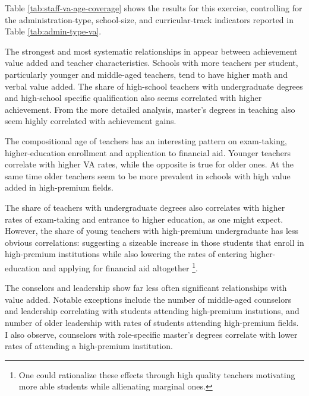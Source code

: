 \documentclass[a4paper, article, english, oneside, unknownkeysallowed, 12pt]{memoir}
\begin{document}


Table \ref{tab:staff-va-age-coverage} shows the results for this exercise, controlling for the administration-type, school-size, and curricular-track indicators reported in Table \ref{tab:admin-type-va}.

The strongest and most systematic relationships in  appear between achievement value added and teacher characteristics.
Schools with more teachers per student, particularly younger and middle-aged teachers, tend to have higher math and verbal value added. 
The share of high-school teachers with undergraduate degrees and high-school specific qualification also seems correlated with higher achievement.
From the more detailed analysis, master's degrees in teaching also seem highly correlated with achievement gains.

The compositional age of teachers has an interesting pattern on exam-taking, higher-education enrollment and application to financial aid. 
Younger teachers correlate with higher VA rates, while the opposite is true for older ones.
At the same time older teachers seem to be more prevalent in schools with high value added in high-premium fields.

The share of teachers with undergraduate degrees also correlates with higher rates of exam-taking and entrance to higher education, as one might expect.
However, the share of young teachers with high-premium undergraduate has less obvious correlations: 
suggesting a sizeable increase in those students that enroll in high-premium institutions while also lowering the rates of entering higher-education and applying for financial aid altogether
\footnote{One could rationalize these effects through high quality teachers motivating more able students while allienating marginal ones. }. 

The conselors and leadership show far less often significant relationships with value added.
Notable exceptions include the number of middle-aged counselors and leadership correlating with students attending high-premium instutions, 
and number of older leadership with rates of students attending high-premium fields. 
I also observe, counselors with role-specific master's degrees correlate with lower rates of attending a high-premium institution.
\end{document}
